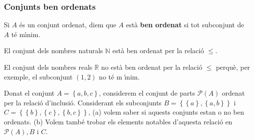 \subsubsection{Conjunts ben ordenats}

Si $A$ \'{e}s un conjunt ordenat, diem que $A$ est\`{a} \textbf{ben ordenat}
si tot subconjunt de $A$ t\'{e} m\'{\i}nim.

\begin{exem}
El conjunt dels nombres naturals $\mathbb{N}$ est\`{a} ben ordenat per la
relaci\'{o} $\leq$.
\end{exem}

\begin{exem}
El conjunt dels nombres reals $\mathbb{R}$ no est\`{a} ben ordenat per la
relaci\'{o} $\leq$ perqu\`{e}, per exemple, el subconjunt $(1,2)$ no t\'{e} m%
\'{\i}nim.
\end{exem}

\begin{exem}
Donat el conjunt $A=\left\{ a,b,c\right\} $, considerem el conjunt de parts $%
\mathcal{P}(A)$ ordenat per la relaci\'{o} d'inclusi\'{o}. Considerant els
subconjunts $B=\left\{ \left\{ a\right\} ,\left\{ a,b\right\} \right\} $ i $%
C=\left\{ \left\{ b\right\} ,\left\{ c\right\} ,\left\{ b,c\right\} \right\}
$, (a) volem saber si aquests conjunts estan o no ben ordenats. (b) Volem
tamb\'{e} trobar els elements notables d'aquesta relaci\'{o} en $\mathcal{P}%
(A),B$ i $C$.
\end{exem}

